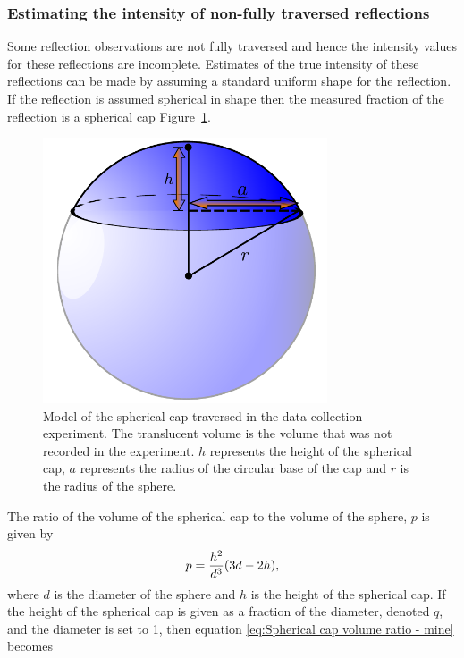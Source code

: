 \subsubsection{Estimating the intensity of non-fully traversed reflections}
\label{subs:Estimating the intensity of non-fully traversed reflections}
Some reflection observations are not fully traversed and hence the intensity values for these reflections are incomplete.
Estimates of the true intensity of these reflections can be made by assuming a standard uniform shape for the reflection.
If the reflection is assumed spherical in shape then the measured fraction of the reflection is a spherical cap Figure~\ref{fig:Spherical Cap}.
\begin{figure}[ht!]
    \centering
    \includegraphics[width=0.75\textwidth]{figures/datared/SphericalCap.pdf}
    \caption{Model of the spherical cap traversed in the data collection experiment.
    The translucent volume is the volume that was not recorded in the experiment.
    $h$ represents the height of the spherical cap, $a$ represents the radius of the circular base of the cap and $r$ is the radius of the sphere.}
    \label{fig:Spherical Cap}
\end{figure}
The ratio of the volume of the spherical cap to the volume of the sphere, $p$ is given by
\begin{equation}
    p = \frac{h^2}{d^3} (3d - 2h),
    \label{eq:Spherical cap volume ratio - mine}
\end{equation}
where $d$ is the diameter of the sphere and $h$ is the height of the spherical cap.
If the height of the spherical cap is given as a fraction of the diameter, denoted $q$, and the diameter is set to 1, then equation \ref{eq:Spherical cap volume ratio - mine} becomes
